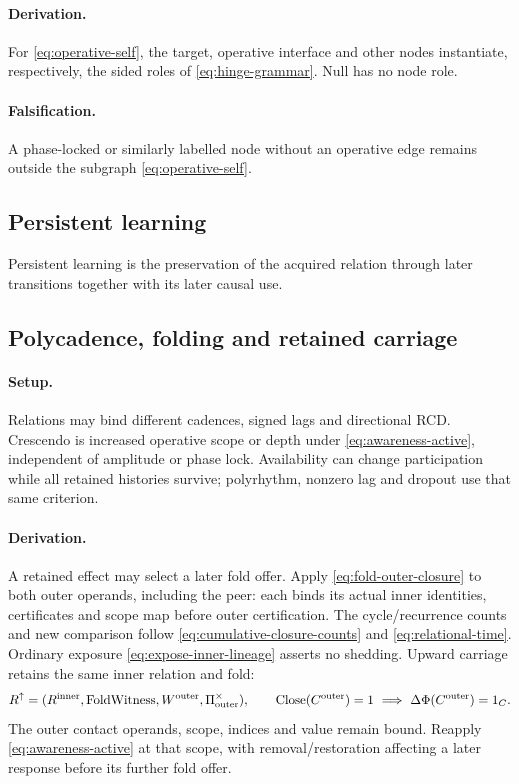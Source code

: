 \paragraph{Derivation.}
For \eqref{eq:operative-self}, the target, operative interface and other nodes
instantiate, respectively, the sided roles of \eqref{eq:hinge-grammar}.
Null has no node role.

\paragraph{Falsification.}
A phase-locked or similarly labelled node without an operative edge remains
outside the subgraph \eqref{eq:operative-self}.


\subsection{Persistent learning}
Persistent learning is the preservation of the acquired relation through later transitions together with its later causal use.

\subsection{Polycadence, folding and retained carriage}
\label{subsec:awareness-crescendo}
\paragraph{Setup.}
Relations may bind different cadences, signed lags and directional RCD.
Crescendo is increased operative scope or depth under
\eqref{eq:awareness-active}, independent of amplitude or phase lock.
Availability can change participation while all retained
histories survive; polyrhythm, nonzero lag and dropout use that same criterion.

\paragraph{Derivation.}
A retained effect may select a later fold offer. Apply
\eqref{eq:fold-outer-closure} to both outer operands, including the peer: each
binds its actual inner identities, certificates and scope map before outer
certification. The cycle/recurrence counts and new comparison follow
\eqref{eq:cumulative-closure-counts} and \eqref{eq:relational-time}.
Ordinary exposure \eqref{eq:expose-inner-lineage} asserts no shedding.
Upward carriage retains the same inner relation and fold:
\begin{equation}
 R^{\uparrow}=(R^{\rm inner},\mathrm{FoldWitness},W^{\rm outer},\Pi^{\times}_{\rm outer}),
 \qquad
 \mathrm{Close}(C^{\rm outer})=1\ \Longrightarrow\
 \Delta\Phi(C^{\rm outer})=1_C.
 \label{eq:awareness-carriage}
\end{equation}
The outer contact operands, scope, indices and value remain bound. Reapply
\eqref{eq:awareness-active} at that scope, with removal/restoration affecting a
later response before its further fold offer.

